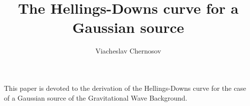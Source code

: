 

\author{Viacheslav Chernosov}
\title{The Hellings-Downs curve for a Gaussian source}


\maketitle

This paper is devoted to the derivation of the Hellings-Downs curve for the case of a Gaussian source of the Gravitational Wave Background.





\newpage
\appendix


